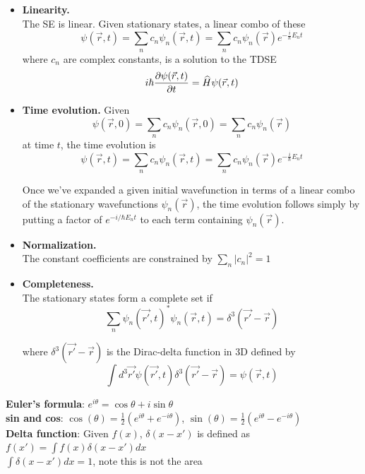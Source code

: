 \begin{itemize}[noitemsep,wide=0pt, leftmargin=\dimexpr{} + 2\relax]
    \item \textbf{Linearity.} \\
        The SE is linear. Given stationary states, a linear combo of these
            $$\psi(\vec{r}, t) = \sum_{n} c_n \psi_n(\vec{r}, t) = \sum_n c_n \psi_n(\vec{r}) e^{-\frac{i}{\hbar} E_n t}$$
        where $c_n$ are complex constants, is a solution to the TDSE 
        $$i \hbar \pdv{\psi(\vec{r}, t)}{t} = \widehat{H} \psi(\vec{r}, t)$$

    \item \textbf{Time evolution.}
        Given $$\psi(\vec{r}, 0) = \sum_n c_n \psi_n(\vec{r}, 0) = \sum_n c_n \psi_n (\vec{r})$$
        at time $t$, the time evolution is 
        $$\psi(\vec{r}, t) = \sum_n c_n \psi_n(\vec{r}, t) = \sum_n c_n \psi_n(\vec{r}) e^{-\frac{i}{\hbar} E_n t}$$

        Once we've expanded a given initial wavefunction in terms of a linear combo of the stationary wavefunctions $\psi_n(\vec{r})$, the time evolution follows simply by putting a factor of $e^{-i/\hbar E_n t}$ to each term containing $\psi_n(\vec{r})$.

    \item \textbf{Normalization.} \\
        The constant coefficients are constrained by $\sum_n |c_n|^2 = 1$

    \item \textbf{Completeness.} \\
        The stationary states form a complete set if
            $$\sum_n \psi_n (\vec{r'}, t)^* \psi_{n} (\vec{r}, t) = \delta^3 (\vec{r'} - \vec{r})$$

        where $\delta^3(\vec{r'} - \vec{r})$ is the Dirac-delta function in 3D defined by $$\int d^3 \vec{r'} \psi(\vec{r'}, t) \delta^3(\vec{r'} - \vec{r}) = \psi(\vec{r}, t)$$
\end{itemize}

\textbf{Euler's formula}: $e^{i \theta} = \cos \theta + i \sin \theta$ \\
\textbf{sin and cos}: $\cos(\theta) = \frac{1}{2}(e^{i \theta} + e^{-i \theta})$, $\sin(\theta) = \frac{1}{2}(e^{i \theta} - e^{-i \theta})$ \\

\textbf{Delta function}: Given $f(x)$, $\delta(x - x')$ is defined as $f(x') = \int f(x) \delta(x - x') dx$ \\
$\int \delta(x - x') dx = 1$, note this is not the area \\

